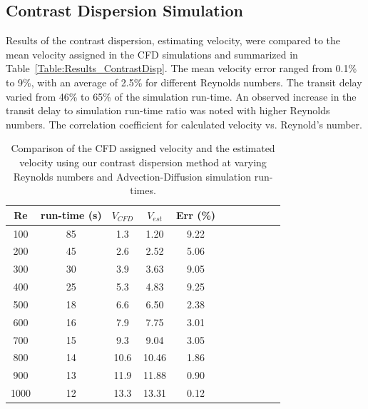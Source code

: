 \documentclass[times,twocolumn,final]{elsarticle}
\begin{document}
\subsection{Contrast Dispersion Simulation}
Results of the contrast dispersion, estimating velocity, were compared to the mean velocity assigned in the CFD simulations and summarized in Table~\ref{Table:Results_ContrastDisp}. The mean velocity error ranged from 0.1\% to 9\%, with an average of 2.5\% for different Reynolds numbers. The transit delay varied from 46\% to 65\% of the simulation run-time. An observed increase in the transit delay to simulation run-time ratio was noted with higher Reynolds numbers. The correlation coefficient for calculated velocity vs. Reynold's number.
\begin{table}[h]
    \centering
    \caption{Comparison of the CFD assigned velocity and the estimated velocity using our contrast dispersion method at varying Reynolds numbers and Advection-Diffusion simulation run-times.}
    \label{Table:VelocityComparison}
    \begin{tabular}{ccccccccccc}
    \hline
    \multicolumn{1}{c}{Re} & \multicolumn{1}{c}{run-time (s)} & \multicolumn{1}{c}{$V_{CFD}$} & \multicolumn{1}{c}{$V_{est}$} & \multicolumn{1}{c}{Err (\%)} \\
    \hline
    100   & 85   & 1.3    & 1.20   & 9.22 \\
    200   & 45   & 2.6    & 2.52   & 5.06 \\
    300   & 30   & 3.9    & 3.63   & 9.05 \\
    400   & 25   & 5.3    & 4.83   & 9.25 \\
    500   & 18   & 6.6    & 6.50   & 2.38 \\
    600   & 16   & 7.9    & 7.75   & 3.01 \\
    700   & 15   & 9.3    & 9.04   & 3.05 \\
    800   & 14   & 10.6   & 10.46  & 1.86 \\
    900   & 13   & 11.9   & 11.88  & 0.90 \\
    1000  & 12   & 13.3   & 13.31  & 0.12 \\
    \hline
    \end{tabular}
    \end{table}
\end{document}
